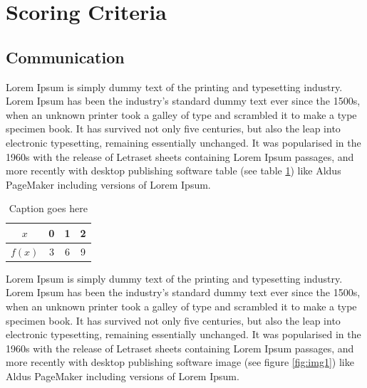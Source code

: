 \documentclass[11pt]{article}
\begin{document}
\section{Scoring Criteria}

\subsection{Communication}

Lorem Ipsum is simply dummy text of the printing and typesetting industry. Lorem Ipsum has been the industry's standard dummy text ever since the 1500s, when an unknown printer took a galley of type and scrambled it to make a type specimen book. It has survived not only five centuries, but also the leap into electronic typesetting, remaining essentially unchanged. It was popularised in the 1960s with the release of Letraset sheets containing Lorem Ipsum passages, and more recently with desktop publishing software table (see table \ref{tab:data1}) like Aldus PageMaker including versions of Lorem Ipsum.\\



\begin{table}[H]
    \centering
        \begin{tabular}{| c | c | c | c |} \hline
            $x$ & 0 & 1 & 2\\ \hline
            $f(x)$ & 3 & 6 & 9\\ \hline
        \end{tabular}
    \caption{Caption goes here}
    \label{tab:data1}
\end{table}



Lorem Ipsum is simply dummy text of the printing and typesetting industry. Lorem Ipsum has been the industry's standard dummy text ever since the 1500s, when an unknown printer took a galley of type and scrambled it to make a type specimen book. It has survived not only five centuries, but also the leap into electronic typesetting, remaining essentially unchanged. It was popularised in the 1960s with the release of Letraset sheets containing Lorem Ipsum passages, and more recently with desktop publishing software image (see figure \ref{fig:img1}) like Aldus PageMaker including versions of Lorem Ipsum.\\
\end{document}
